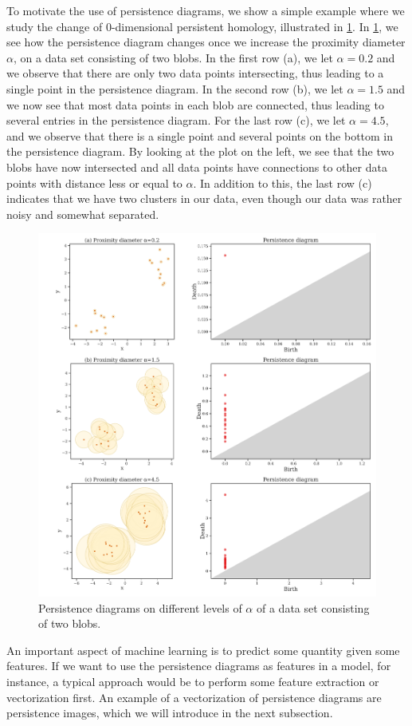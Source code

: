 To motivate the use of persistence diagrams, we show a simple example where we study the change of 0-dimensional persistent homology, illustrated in \cref{fig:persistence-diagram-example}. In \cref{fig:persistence-diagram-example}, we see how the persistence diagram changes once we increase the proximity diameter $\alpha$, on a data set consisting of two blobs. In the first row (a), we let $\alpha=0.2$ and we observe that there are only two data points intersecting, thus leading to a single point in the persistence diagram. In the second row (b), we let $\alpha=1.5$ and we now see that most data points in each blob are connected, thus leading to several entries in the persistence diagram. For the last row (c), we let $\alpha=4.5$, and we observe that there is a single point and several points on the bottom in the persistence diagram. By looking at the plot on the left, we see that the two blobs have now intersected and all data points have connections to other data points with distance less or equal to $\alpha$. In addition to this, the last row (c) indicates that we have two clusters in our data, even though our data was rather noisy and somewhat separated.
\begin{figure}[H]
    \centering
    \includegraphics[width=1\textwidth]{thesis/figures/persistence-diagram-example.pdf}
    \caption{Persistence diagrams on different levels of $\alpha$ of a data set consisting of two blobs.}
    \label{fig:persistence-diagram-example}
\end{figure}
An important aspect of machine learning is to predict some quantity given some features. If we want to use the persistence diagrams as features in a model, for instance, a typical approach would be to perform some feature extraction or vectorization first. An example of a vectorization of persistence diagrams are persistence images, which we will introduce in the next subsection.

